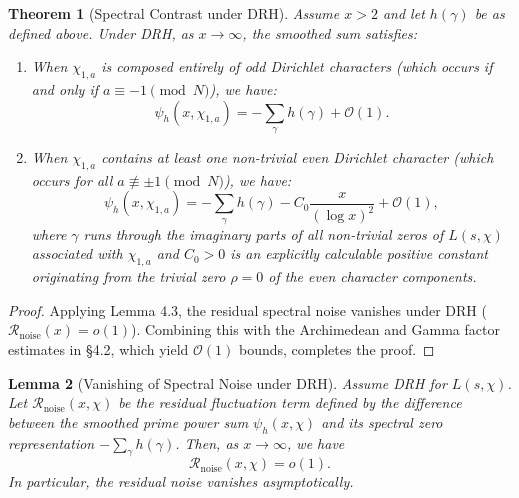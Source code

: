 \documentclass[12pt,reqno]{amsart}
\newtheorem{theorem}{Theorem}[section]
\newtheorem{lemma}[theorem]{Lemma}
\theoremstyle{definition}
\theoremstyle{remark}
\numberwithin{equation}{section}
\begin{document}
\begin{theorem}[Spectral Contrast under DRH]
\label{thm:spectral_contrast}
Assume $x > 2$ and let $h(\gamma)$ be as defined above. Under DRH, as $x \to \infty$, the smoothed sum satisfies:
\begin{enumerate}
    \item When $\chi_{1,a}$ is composed entirely of odd Dirichlet characters (which occurs if and only if $a \equiv -1 \pmod N$), we have:
    \[
    \psi_h(x, \chi_{1,a}) = -\sum_{\gamma} h(\gamma) + \mathcal{O}(1).
    \]
    \item When $\chi_{1,a}$ contains at least one non-trivial even Dirichlet character (which occurs for all $a \not\equiv \pm 1 \pmod N$), we have:
    \[
    \psi_h(x, \chi_{1,a}) = -\sum_{\gamma} h(\gamma) - C_0 \frac{x}{(\log x)^2} + \mathcal{O}(1),
    \]
    where $\gamma$ runs through the imaginary parts of all non-trivial zeros of $L(s, \chi)$ associated with $\chi_{1,a}$ and $C_0 > 0$ is an explicitly calculable positive constant originating from the trivial zero $\rho = 0$ of the even character components.
\end{enumerate}
\end{theorem}

\begin{proof}
Applying Lemma 4.3, the residual spectral noise vanishes under DRH ($\mathcal{R}_{\mathrm{noise}}(x) = o(1)$). Combining this with the Archimedean and Gamma factor estimates in §4.2, which yield $\mathcal{O}(1)$ bounds, completes the proof. 
\end{proof}

\begin{lemma}[Vanishing of Spectral Noise under DRH] \label{lem:DRH-noise}
Assume DRH for $L(s, \chi)$. Let $\mathcal{R}_{\mathrm{noise}}(x, \chi)$ be the residual fluctuation term defined by the difference between the smoothed prime power sum $\psi_h(x, \chi)$ and its spectral zero representation $-\sum_{\gamma} h(\gamma)$. Then, as $x \to \infty$, we have
\[
\mathcal{R}_{\mathrm{noise}}(x, \chi) = o(1).
\]
In particular, the residual noise vanishes asymptotically.
\end{lemma}
\end{document}
